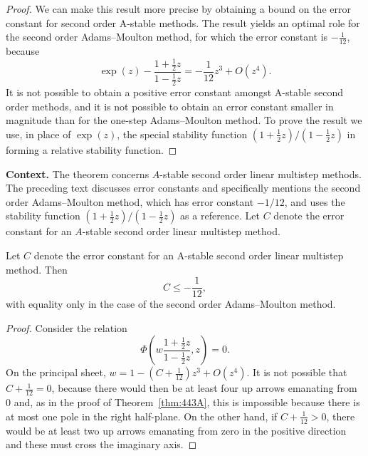 \begin{theorem}
\begin{proof}
We can make this result more precise by obtaining a bound on the error constant for second order A-stable methods. The result yields an optimal role for the second order Adams--Moulton method, for which the error constant is $-\frac{1}{12}$, because
\[
\exp(z) - \frac{1 + \frac{1}{2}z}{1 - \frac{1}{2}z} = -\frac{1}{12}z^{3} + O(z^{4}).
\]
It is not possible to obtain a positive error constant amongst A-stable second order methods, and it is not possible to obtain an error constant smaller in magnitude than for the one-step Adams--Moulton method. To prove the result we use, in place of $\exp(z)$, the special stability function $(1 + \frac{1}{2}z)/(1 - \frac{1}{2}z)$ in forming a relative stability function.
\end{proof}

\noindent\textbf{Context.}
The theorem concerns $A$-stable second order linear multistep methods. The preceding text discusses error constants and specifically mentions the second order Adams--Moulton method, which has error constant $-1/12$, and uses the stability function $(1 + \frac{1}{2}z)/(1 - \frac{1}{2}z)$ as a reference. Let $C$ denote the error constant for an $A$-stable second order linear multistep method.

\begin{theorem}

  \label{thm:443B}
Let \( C \) denote the error constant for an A-stable second order linear multistep method. Then
\[
C \leq -\frac{1}{12},
\]
with equality only in the case of the second order Adams--Moulton method.
\end{theorem}

\begin{proof}
Consider the relation
\[
\Phi\left( w \frac{1 + \frac{1}{2}z}{1 - \frac{1}{2}z}, z \right) = 0.
\]
On the principal sheet, \( w = 1 - \left( C + \frac{1}{12} \right) z^3 + O(z^4) \). It is not possible that \( C + \frac{1}{12} = 0 \), because there would then be at least four up arrows emanating from 0 and, as in the proof of Theorem~\ref{thm:443A}, this is impossible because there is at most one pole in the right half-plane. On the other hand, if \( C + \frac{1}{12} > 0 \), there would be at least two up arrows emanating from zero in the positive direction and these must cross the imaginary axis.
\end{proof}


\end{theorem}

